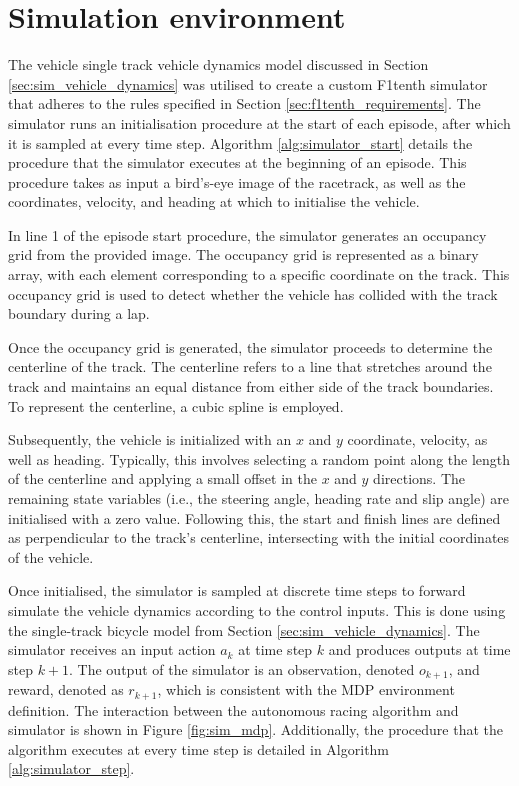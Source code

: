 \section{Simulation environment}\label{sec:simulation_environment}

The vehicle single track vehicle dynamics model discussed in Section \ref{sec:sim_vehicle_dynamics} was utilised to create a custom F1tenth simulator
that adheres to the rules specified in Section \ref{sec:f1tenth_requirements}. 
The simulator runs an initialisation procedure at the start of each episode, after which it is sampled at every time step.
Algorithm \ref{alg:simulator_start} details the procedure that the simulator executes at the beginning of an episode.
This procedure takes as input a bird's-eye image of the racetrack, as well as the coordinates, velocity, and heading at which to initialise the vehicle. 

In line 1 of the episode start procedure, the simulator generates an occupancy grid from the provided image. 
The occupancy grid is represented as a binary array, with each element corresponding to a specific coordinate on the track. 
This occupancy grid is used to detect whether the vehicle has collided with the track boundary during a lap.



Once the occupancy grid is generated, the simulator proceeds to determine the centerline of the track. 
The centerline refers to a line that stretches around the track and maintains an equal distance from either side of the track boundaries. 
To represent the centerline, a cubic spline \cite{Sakai2018} is employed.

Subsequently, the vehicle is initialized with an $x$ and $y$ coordinate, velocity, as well as heading.
Typically, this involves selecting a random point along the length of the centerline and applying a small offset in the $x$ and $y$ directions. 
The remaining state variables (i.e., the steering angle, heading rate and slip angle) are initialised with a zero value.
Following this, the start and finish lines are defined as perpendicular to the track's centerline, intersecting with the initial coordinates of the vehicle.


Once initialised, the simulator is sampled at discrete time steps to forward simulate the vehicle dynamics according to the control inputs.
This is done using the single-track bicycle model from Section \ref{sec:sim_vehicle_dynamics}.
The simulator receives an input action $a_{k}$ at time step $k$ and produces outputs at time step $k+1$.
The output of the simulator is an observation, denoted $o_{k+1}$, and reward, denoted as $r_{k+1}$, which is consistent with the MDP environment definition.
The interaction between the autonomous racing algorithm and simulator is shown in Figure \ref{fig:sim_mdp}.
Additionally, the procedure that the algorithm executes at every time step is detailed in Algorithm \ref{alg:simulator_step}.

